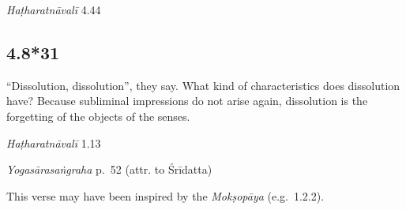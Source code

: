 \begin{ekdosis}

\begin{testimonia}[hp04_008_30]
\emph{Haṭharatnāvalī} 4.44
\begin{versinnote}
\end{versinnote}
\end{testimonia}


\subsection*{4.8*31}
\begin{translation}[hp04_008_31]
“Dissolution, dissolution”, they say. What kind of characteristics does dissolution have? Because subliminal impressions do not arise again, dissolution is the forgetting of the objects of the senses.
\end{translation}


\begin{testimonia}[hp04_008_31]
\emph{Haṭharatnāvalī} 1.13
\begin{versinnote}
\end{versinnote}

\emph{Yogasārasaṅgraha} p.~52 (attr. to Śrīdatta)
\begin{versinnote}
\end{versinnote}
\end{testimonia}

\begin{philcomm}[hp04_008_31]
This verse may have been inspired by the \emph{Mokṣopāya} (e.g.~1.2.2).
\end{philcomm}


\end{ekdosis}
